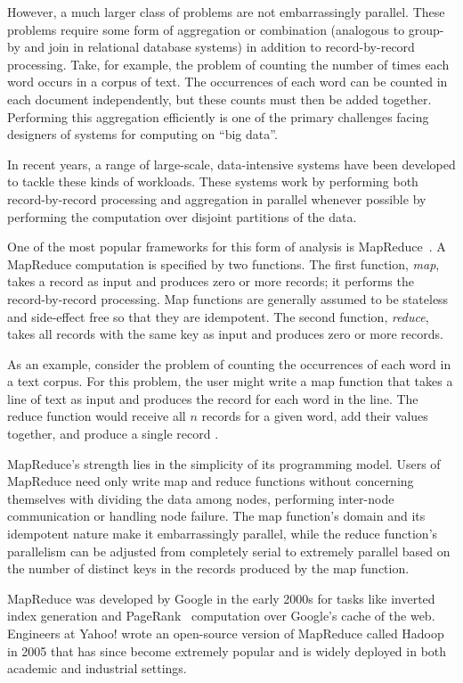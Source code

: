 However, a much larger class of problems are not embarrassingly parallel. These
problems require some form of aggregation or combination (analogous to group-by
and join in relational database systems) in addition to record-by-record
processing. Take, for example, the problem of counting the number of times each
word occurs in a corpus of text. The occurrences of each word can be counted in
each document independently, but these counts must then be added
together. Performing this aggregation efficiently is one of the primary
challenges facing designers of systems for computing on ``big data''.

In recent years, a range of large-scale, data-intensive systems have been
developed to tackle these kinds of workloads.  These systems work by
performing both record-by-record processing and aggregation in parallel whenever
possible by performing the computation over disjoint partitions of the
data.

One of the most popular frameworks for this form of analysis is
MapReduce~\cite{mapreduce}. A MapReduce computation is specified by two
functions. The first function, \emph{map}, takes a record as input and produces
zero or more records; it performs the record-by-record processing. Map
functions are generally assumed to be stateless and side-effect free so that
they are idempotent. The second function, \emph{reduce}, takes all records with
the same key as input and produces zero or more records.

As an example, consider the problem of counting the occurrences of each word in
a text corpus. For this problem, the user might write a map function that takes
a line of text as input and produces the record  for each word
in the line. The reduce function would receive all $n$ records for a given
word, add their values together, and produce a single record .

MapReduce's strength lies in the simplicity of its programming model. Users of
MapReduce need only write map and reduce functions without concerning
themselves with dividing the data among nodes, performing inter-node
communication or handling node failure. The map function's domain and its
idempotent nature make it embarrassingly parallel, while the reduce function's
parallelism can be adjusted from completely serial to extremely parallel based
on the number of distinct keys in the records produced by the map function.

MapReduce was developed by Google in the early 2000s for tasks like inverted
index generation and PageRank~\cite{pagerank} computation over Google's cache
of the web. Engineers at Yahoo! wrote an open-source version of MapReduce
called Hadoop~\cite{hadoop} in 2005 that has since become extremely popular and
is widely deployed in both academic and industrial settings.


